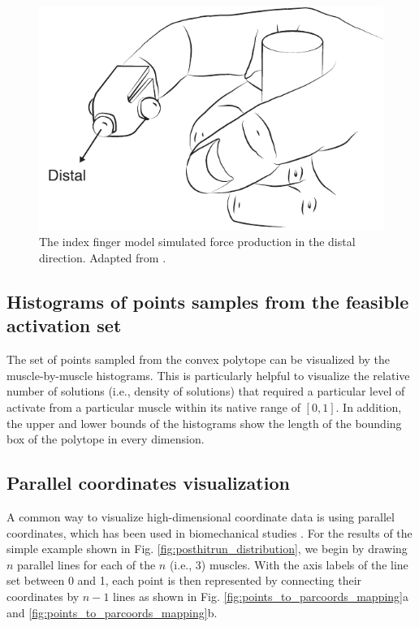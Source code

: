 \begin{figure}[ht]
  \centering
  \includegraphics[]{sections/figs/finger.pdf}
  \caption{The index finger model simulated force production in the distal direction. Adapted from \cite{Valero-Cuevas1998Large}.}
  \label{fig:finger}
\end{figure}


\subsection*{Histograms of points samples from the feasible activation set}
The set of points sampled from the convex polytope can be visualized by the muscle-by-muscle histograms.  This is particularly  helpful to  visualize the relative number of solutions (i.e., density of solutions) that required a particular level of activate from a particular muscle within its native range of $[0,1]$. In addition, the upper and lower bounds of the histograms show the length of the bounding box of the polytope in every dimension. 

\subsection*{Parallel coordinates visualization}
A common way to visualize high-dimensional coordinate data is using parallel coordinates, which has been used in biomechanical studies \cite{bachynskyi2013biomechanical, krekel2010visual}.
For the results of the simple example shown in Fig. \ref{fig:posthitrun_distribution}, we begin by drawing $n$ parallel lines for each of the $n$ (i.e., 3) muscles.
With the axis labels of the line set between 0 and 1, each point is then represented by connecting their coordinates by $n-1$ lines as shown in Fig. \ref{fig:points_to_parcoords_mapping}a and \ref{fig:points_to_parcoords_mapping}b. 



